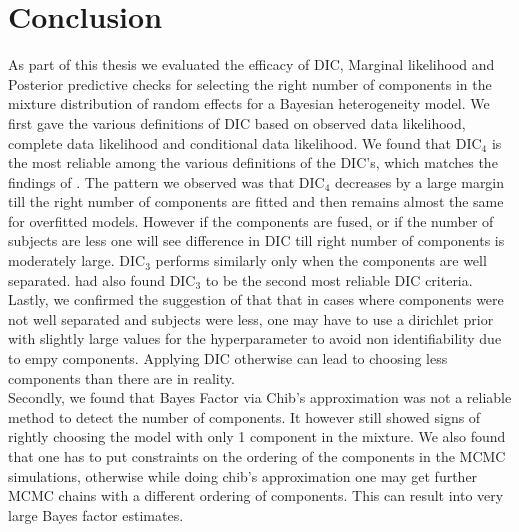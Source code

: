 
\chapter{Conclusion}
\label{ch : conclusion}

As part of this thesis we evaluated the efficacy of DIC, Marginal likelihood and Posterior predictive checks for selecting the right number of components in the mixture distribution of random effects for a Bayesian heterogeneity model. We first gave the various definitions of DIC based on observed data likelihood, complete data likelihood and conditional data likelihood. We found that $\text{DIC}_4$ is the most reliable among the various definitions of the DIC's, which matches the findings of \citet{celeux_deviance_2006}. The pattern we observed was that $\text{DIC}_4$ decreases by a large margin till the right number of components are fitted and then remains almost the same for overfitted models. However if the components are fused, or if the number of subjects are less one will see difference in DIC till right number of components is moderately large. $\text{DIC}_3$ performs similarly only when the components are well separated. \citet{celeux_deviance_2006} had also found $\text{DIC}_3$ to be the second most reliable DIC criteria. Lastly, we confirmed the suggestion of \citet{fruhwirth-schnatter_finite_2013} that that in cases where components were not well separated and subjects were less, one may have to use a dirichlet prior with slightly large values for the hyperparameter to avoid non identifiability due to empy components. Applying DIC otherwise can lead to choosing less components than there are in reality.\\

Secondly, we found that Bayes Factor via Chib's approximation was not a reliable method to detect the number of components. It however still showed signs of rightly choosing the model with only 1 component in the mixture. We also found that one has to put constraints on the ordering of the components in the MCMC simulations, otherwise while doing chib's approximation one may get further MCMC chains with a different ordering of components. This can result into very large Bayes factor estimates.\\

